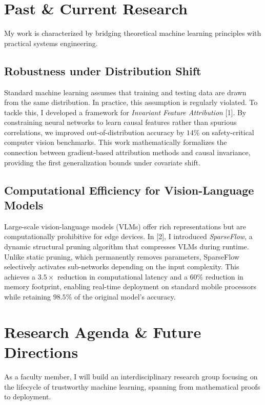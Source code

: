 \documentclass[10pt,a4paper]{article}
\begin{document}
\section{Past \& Current Research}
My work is characterized by bridging theoretical machine learning principles with practical systems engineering. 

\subsection{Robustness under Distribution Shift}
Standard machine learning assumes that training and testing data are drawn from the same distribution. In practice, this assumption is regularly violated. To tackle this, I developed a framework for \emph{Invariant Feature Attribution} [1]. By constraining neural networks to learn causal features rather than spurious correlations, we improved out-of-distribution accuracy by $14\%$ on safety-critical computer vision benchmarks. This work mathematically formalizes the connection between gradient-based attribution methods and causal invariance, providing the first generalization bounds under covariate shift.

\subsection{Computational Efficiency for Vision-Language Models}
Large-scale vision-language models (VLMs) offer rich representations but are computationally prohibitive for edge devices. In [2], I introduced \emph{SparseFlow}, a dynamic structural pruning algorithm that compresses VLMs during runtime. Unlike static pruning, which permanently removes parameters, SparseFlow selectively activates sub-networks depending on the input complexity. This achieves a $3.5\times$ reduction in computational latency and a $60\%$ reduction in memory footprint, enabling real-time deployment on standard mobile processors while retaining $98.5\%$ of the original model's accuracy.

\section{Research Agenda \& Future Directions}
As a faculty member, I will build an interdisciplinary research group focusing on the lifecycle of trustworthy machine learning, spanning from mathematical proofs to deployment.
\end{document}
